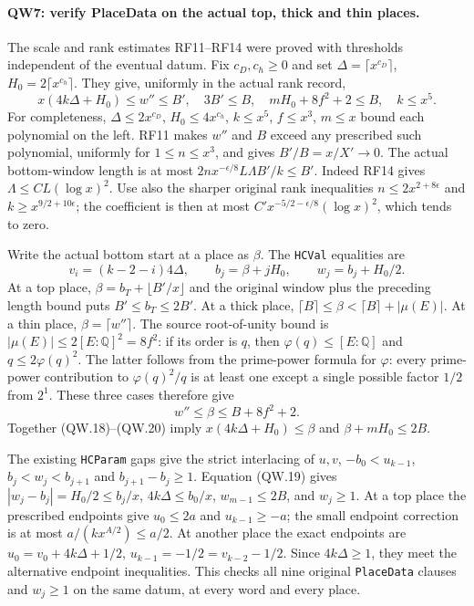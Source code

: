 \paragraph{QW7: verify PlaceData on the actual top, thick and thin places.}
The scale and rank estimates RF11--RF14 were proved with thresholds
independent of the eventual datum. Fix $c_D,c_h\ge0$ and set
$\Delta=\lceil x^{c_D}\rceil$, $H_0=2\lceil x^{c_h}\rceil$.
They give, uniformly in the actual rank record,
\[
 x(4k\Delta+H_0)\le w''\le B',\quad 3B'\le B,\quad
 mH_0+8f^2+2\le B,\quad k\le x^5.                             \tag{QW.18}
\]
For completeness, $\Delta\le2x^{c_D}$, $H_0\le4x^{c_h}$,
$k\le x^5$, $f\le x^3$, $m\le x$ bound each polynomial on the left.
RF11 makes $w''$ and $B$ exceed any prescribed such polynomial,
uniformly for $1\le n\le x^3$, and gives $B'/B=x/X'\to0$.
The actual bottom-window length is at most
$2n x^{-\epsilon/8}L\Lambda B'/k\le B'$. Indeed RF14 gives
$\Lambda\le C L(\log x)^2$. Use also the sharper original rank
inequalities $n\le2x^{2+8\epsilon}$ and
$k\ge x^{9/2+10\epsilon}$; the coefficient is then at most
$C' x^{-5/2-\epsilon/8}(\log x)^2$, which tends to zero.

Write the actual bottom start at a place as $\beta$. The \texttt{HCVal}
equalities are
\[
 v_i=(k-2-i)4\Delta,\qquad b_j=\beta+jH_0,\qquad
                         w_j=b_j+H_0/2.                       \tag{QW.19}
\]
At a top place, $\beta=b_T+\lfloor B'/x\rfloor$ and the original
window plus the preceding length bound puts $B'\le b_T\le2B'$.
At a thick place, $\lceil B\rceil\le\beta<\lceil B\rceil+
|\mu(E)|$. At a thin place, $\beta=\lceil w''\rceil$.
The source root-of-unity bound is
$|\mu(E)|\le2[E:\mathbb Q]^2=8f^2$: if its order is $q$, then
$\varphi(q)\le[E:\mathbb Q]$ and $q\le2\varphi(q)^2$.
The latter follows from the prime-power formula for $\varphi$:
every prime-power contribution to $\varphi(q)^2/q$ is at least one
except a single possible factor $1/2$ from $2^1$.
These three cases therefore give
\[
                   w''\le\beta\le B+8f^2+2.                  \tag{QW.20}
\]
Together (QW.18)--(QW.20) imply
$x(4k\Delta+H_0)\le\beta$ and $\beta+mH_0\le2B$.

The existing \texttt{HCParam} gaps give the strict interlacing of $u,v$,
$-b_0<u_{k-1}$, $b_j<w_j<b_{j+1}$ and $b_{j+1}-b_j\ge1$.
Equation (QW.19) gives $|w_j-b_j|=H_0/2\le b_j/x$,
$4k\Delta\le b_0/x$, $w_{m-1}\le2B$, and $w_j\ge1$.
At a top place the prescribed endpoints give $u_0\le2a$ and
$u_{k-1}\ge-a$; the small endpoint correction is at most
$a/(k x^{A/2})\le a/2$. At another place the exact endpoints are
$u_0=v_0+4k\Delta+1/2$, $u_{k-1}=-1/2=v_{k-2}-1/2$.
Since $4k\Delta\ge1$, they meet the alternative endpoint inequalities.
This checks all nine original \texttt{PlaceData} clauses and $w_j\ge1$
on the same datum, at every word and every place.

